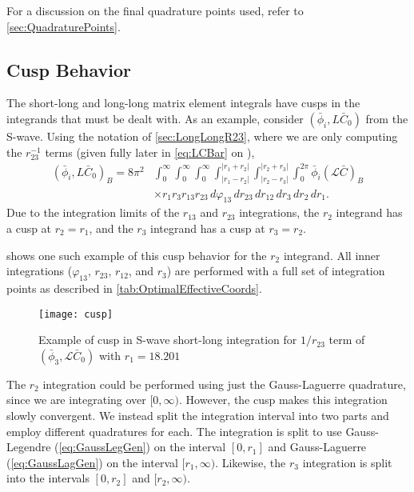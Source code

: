 \documentclass[Dissertation.tex]{subfiles}
\begin{document}

For a discussion on the final quadrature points used, refer to \cref{sec:QuadraturePoints}.




\subsection{Cusp Behavior}
\label{sec:Cusps}

The short-long and long-long matrix element integrals have cusps in the
integrands that must be dealt with. As an example, consider
$(\bar{\phi}_i, L\bar{C}_0)$ from the S-wave. Using the notation of
\cref{sec:LongLongR23}, where we are only computing the $r_{23}^{-1}$ terms
(given fully later in \cref{eq:LCBar} on \pageref{eq:LCBar}),
\begin{align}
(\bar{\phi}_i, L\bar{C}_0)_B = 8\pi^2 & \int_0^\infty \int_0^\infty \int_0^\infty \int_{|r_1 - r_2|}^{|r_1 + r_2|} \int_{|r_2 - r_3|}^{|r_2 + r_3|} \int_0^{2\pi} \bar{\phi}_i (\mathcal{L} \bar{C})_B  \nonumber \\
& \times r_1 r_3 r_{13} r_{23}\, d\varphi_{13}\, dr_{23}\, dr_{12}\, dr_3\, dr_2\, dr_1.
\end{align}
Due to the integration limits of the $r_{13}$ and $r_{23}$ integrations, the
$r_2$ integrand has a cusp at $r_2 = r_1$, and the $r_3$ integrand has a cusp
at $r_3 = r_2$.

 shows one such example of this cusp behavior for the $r_2$ 
integrand. All inner integrations ($\varphi_{13}$, $r_{23}$, $r_{12}$, and $r_3$)
are performed with a full set of integration points as described in
\cref{tab:OptimalEffectiveCoords}.

\begin{figure}
	\centering
	\texttt{[image: cusp]}
	\caption[Example of cusp in S-wave short-long integration]{Example of cusp
in S-wave short-long integration for $1/r_{23}$ term of
$(\bar{\phi}_3, \mathcal{L}\bar{C}_0)$ with \mbox{$r_1 = 18.201$}}
	\label{fig:cusp}
\end{figure}

The $r_2$ integration could be performed using just the Gauss-Laguerre 
quadrature, since we are integrating over $[0,\infty)$. However, the cusp 
makes this integration slowly convergent. We instead split the integration 
interval into two parts and employ different quadratures for each. The 
integration is split to use Gauss-Legendre (\cref{eq:GaussLegGen}) on the 
interval $[0,r_1]$ and Gauss-Laguerre (\cref{eq:GaussLagGen}) on the interval 
$[r_1,\infty)$. Likewise, the $r_3$ integration is split into the intervals
$[0,r_2]$ and $[r_2,\infty)$.
\end{document}
